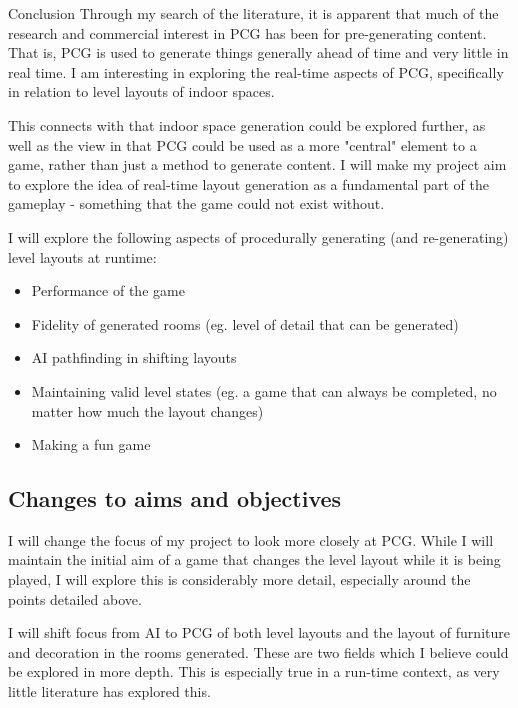 \documentclass[review]{cmpreport}
\begin{document}
\begin{section}{Conclusion}
Through my search of the literature, it is apparent that much of the research and commercial interest in PCG has been for pre-generating content. That is, PCG is used to generate things generally ahead of time and very little in real time. I am interesting in exploring the real-time aspects of PCG, specifically in relation to level layouts of indoor spaces. \par 
This connects with \cite{Hendrikx:2013:PCG:2422956.2422957} that indoor space generation could be explored further, as well as the view in \cite{shaker2016procedural} that PCG could be used as a more "central" element to a game, rather than just a method to generate content. I will make my project aim to explore the idea of real-time layout generation as a fundamental part of the gameplay - something that the game could not exist without. \par
I will explore the following aspects of procedurally generating (and re-generating) level layouts at runtime:
\begin{itemize}
    \item Performance of the game
    \item Fidelity of generated rooms (eg. level of detail that can be generated)
    \item AI pathfinding in shifting layouts
    \item Maintaining valid level states (eg. a game that can always be completed, no matter how much the layout changes)
    \item Making a fun game
\end{itemize}

\subsection{Changes to aims and objectives}
I will change the focus of my project to look more closely at PCG. While I will maintain the initial aim of a game that changes the level layout while it is being played, I will explore this is considerably more detail, especially around the points detailed above. \par 
I will shift focus from AI to PCG of both level layouts and the layout of furniture and decoration in the rooms generated. These are two fields which I believe could be explored in more depth. This is especially true in a run-time context, as very little literature has explored this.


\end{section}
\end{document}
